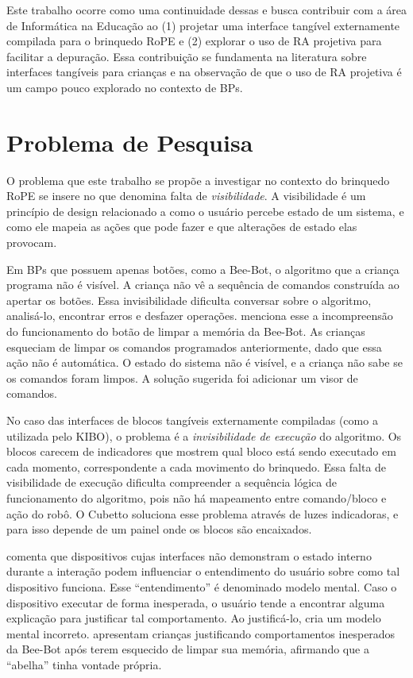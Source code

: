 Este trabalho ocorre como uma continuidade dessas e busca contribuir com a área de Informática na Educação ao (1) projetar uma interface tangível externamente compilada para o brinquedo RoPE e (2) explorar o uso de RA projetiva para facilitar a depuração. Essa contribuição se fundamenta na literatura sobre interfaces tangíveis para crianças \cite{sapounidis_evaluating_2015, fincher_tangible_2019, plowman_interactivity_2004} e na observação de que o uso de RA projetiva é um campo pouco explorado no contexto de BPs.

\section{Problema de Pesquisa} \label{s_cintro_problema_pesquisa}

O problema que este trabalho se propõe a investigar no contexto do brinquedo RoPE se insere no que  denomina falta de \textit{visibilidade}. A visibilidade é um princípio de design relacionado a como o usuário percebe estado de um sistema, e como ele mapeia as ações que pode fazer e que alterações de estado elas provocam.

Em BPs que possuem apenas botões, como a Bee-Bot, o algoritmo que a criança programa não é visível. A criança não vê a sequência de comandos construída ao apertar os botões. Essa invisibilidade dificulta conversar sobre o algoritmo, analisá-lo, encontrar erros e desfazer operações.  menciona esse a incompreensão do funcionamento do botão de limpar a memória da Bee-Bot. As crianças esqueciam de limpar os comandos programados anteriormente, dado que essa ação não é automática. O estado do sistema não é visível, e a criança não sabe se os comandos foram limpos. A solução sugerida foi adicionar um visor de comandos.

No caso das interfaces de blocos tangíveis externamente compiladas (como a utilizada pelo KIBO), o problema é a \textit{invisibilidade de execução} do algoritmo. Os blocos carecem de indicadores que mostrem qual bloco está sendo executado em cada momento, correspondente a cada movimento do brinquedo. Essa falta de visibilidade de execução dificulta compreender a sequência lógica de funcionamento do algoritmo, pois não há mapeamento entre comando/bloco e ação do robô. O Cubetto soluciona esse problema através de luzes indicadoras, e para isso depende de um painel onde os blocos são encaixados.

 comenta que dispositivos cujas interfaces não demonstram o estado interno durante a interação podem influenciar o entendimento do usuário sobre como tal dispositivo funciona. Esse “entendimento” é denominado modelo mental. Caso o dispositivo executar de forma inesperada, o usuário tende a encontrar alguma explicação para justificar tal comportamento. Ao justificá-lo, cria um modelo mental incorreto.  apresentam crianças justificando comportamentos inesperados da Bee-Bot após terem esquecido de limpar sua memória, afirmando que a “abelha” tinha vontade própria.

